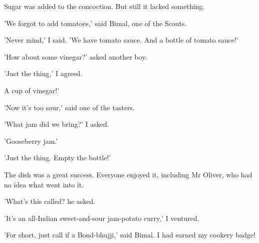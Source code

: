 Sugar was added to the concoction. But still it lacked something.
\par
'We forgot to add tomatoes,' said Bimal, one of the Scouts.
\par
'Never mind,' I said. 'We have tomato sauce. And a bottle of tomato sauce!'
\par
'How about some vinegar?' asked another boy.
\par
'Just the thing,' I agreed.
\par
A cup of vinegar!'
\par
'Now it's too sour,' said one of the tasters.
\par
'What jam did we bring?' I asked.
\par
'Gooseberry jam.'
\par
'Just the thing. Empty the bottle!'
\par
The dish was a great success. Everyone enjoyed it, including Mr Oliver, who had no idea what went into it.
\par
'What's this called? he asked.
\par
'It's an all-Indian sweet-and-sour jam-potato curry,' I ventured.
\par
'For short, just call if a Bond-bhujji,' said Bimal. I had earned my cookery badge!
\vspace{0.5in}


